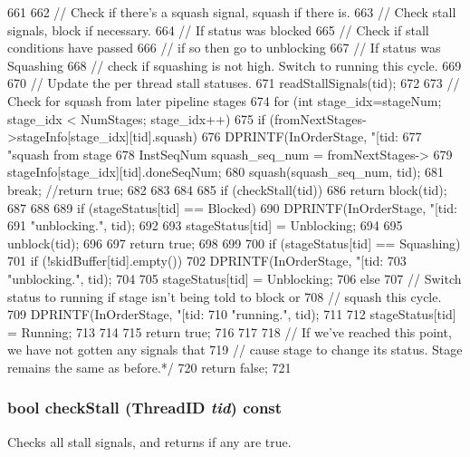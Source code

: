 \begin{DoxyCode}
661 {
662     // Check if there's a squash signal, squash if there is.
663     // Check stall signals, block if necessary.
664     // If status was blocked
665     //     Check if stall conditions have passed
666     //         if so then go to unblocking
667     // If status was Squashing
668     //     check if squashing is not high.  Switch to running this cycle.
669 
670     // Update the per thread stall statuses.
671     readStallSignals(tid);
672 
673     // Check for squash from later pipeline stages
674     for (int stage_idx=stageNum; stage_idx < NumStages; stage_idx++) {
675         if (fromNextStages->stageInfo[stage_idx][tid].squash) {
676             DPRINTF(InOrderStage, "[tid:%
677                     "squash from stage %
678             InstSeqNum squash_seq_num = fromNextStages->
679                 stageInfo[stage_idx][tid].doneSeqNum;
680             squash(squash_seq_num, tid);
681             break; //return true;
682         }
683     }
684 
685     if (checkStall(tid)) {
686         return block(tid);
687     }
688 
689     if (stageStatus[tid] == Blocked) {
690         DPRINTF(InOrderStage, "[tid:%
691                 "unblocking.\n", tid);
692 
693         stageStatus[tid] = Unblocking;
694 
695         unblock(tid);
696 
697         return true;
698     }
699 
700     if (stageStatus[tid] == Squashing) {
701         if (!skidBuffer[tid].empty()) {
702             DPRINTF(InOrderStage, "[tid:%
703                     "unblocking.\n", tid);
704 
705             stageStatus[tid] = Unblocking;
706         } else {
707             // Switch status to running if stage isn't being told to block or
708             // squash this cycle.
709             DPRINTF(InOrderStage, "[tid:%
710                     "running.\n", tid);
711 
712             stageStatus[tid] = Running;
713         }
714 
715         return true;
716     }
717 
718     // If we've reached this point, we have not gotten any signals that
719     // cause stage to change its status.  Stage remains the same as before.*/
720     return false;
721 }
\end{DoxyCode}
\hypertarget{classPipelineStage_a6ba4f2f95d991f5be818dabf7500feed}{
\subsubsection[{checkStall}]{\setlength{\rightskip}{0pt plus 5cm}bool checkStall ({\bf ThreadID} {\em tid}) const}}
\label{classPipelineStage_a6ba4f2f95d991f5be818dabf7500feed}
Checks all stall signals, and returns if any are true. 


